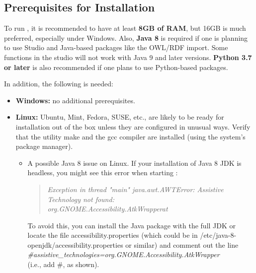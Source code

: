 \documentclass[11pt]{article}
\newcommand{\ERGOAI}{\mbox{\smaller{\ensuremath{\cal{E}}\smaller{{\sc{RGO}}}\ensuremath{\cal{AI}}}}\xspace}
\begin{document}
\subsection{Prerequisites for Installation}\label{sec-inst-prereq}

To run \ERGOAI, it is recommended to have at least \textbf{8GB of RAM}, but
16GB is much preferred, especially under Windows. Also, \textbf{Java 8} is
required if one is planning to use \ERGOAI Studio and Java-based packages
like the OWL/RDF import. Some functions in the studio will not work with
Java 9 and later versions.  \textbf{Python 3.7 or later} is also
recommended if one plans to use Python-based packages.

\noindent
In addition, the following is needed:
\begin{itemize}
\item[] \textbf{Windows:}  no additional prerequisites.
\item[] \textbf{Linux:} Ubuntu, Mint, Fedora, SUSE, etc., are likely to be
  ready for installation out of the box unless they are configured in
  unusual ways.  Verify that the utility make and the gcc compiler are
  installed (using the system's package manager).

  \begin{itemize}
  \item A possible Java 8 issue on Linux.  If your installation of Java 8 JDK
    is headless, you might see this error when starting \ERGOAI:
    
    \begin{quote}
      \it
      Exception in thread "main" java.awt.AWTError: Assistive Technology not found:\\
      org.GNOME.Accessibility.AtkWrapperat
    \end{quote}
    
    To avoid this, you can install the Java package with the full JDK or
    locate the file accessibility.properties (which could be in
    /etc/java-8-openjdk/accessibility.properties or similar) and comment
    out the line
    \\
    \hspace*{8mm}
    \emph{\#assistive\_technologies=org.GNOME.Accessibility.AtkWrapper}
    \\
    (i.e., add \#, as shown).
    

\end{itemize}
\end{itemize}
\end{document}
